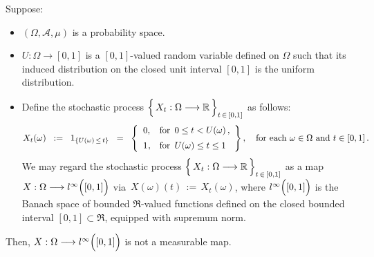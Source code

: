 \begin{example}
\mbox{}\vskip 0.1cm
\noindent
Suppose:
\begin{itemize}
\item
	$(\Omega,\mathcal{A},\mu)$ is a probability space.
\item
	$U : \Omega \longrightarrow [0,1]$ is a $[0,1]$-valued random variable
	defined on $\Omega$ such that its induced distribution on the closed
	unit interval $[0,1]$ is the uniform distribution.
\item
	Define the stochastic process
	$\left\{\, X_{t} : \Omega \overset{{\color{white}-}}{\longrightarrow} \Re \,\right\}_{t\,\in\,[0,1]}$
	as follows:
	\begin{equation*}
	X_{t}(\omega)
	\;\; := \;\;
		1_{\{U(\omega)\,\leq\,t\}}
	\;\; = \;\;
		\left\{\begin{array}{cl}
		0, & \textnormal{for \,$0 \leq t < U(\omega)$}\,,
		\\
		\overset{{\color{white}+}}{1}, & \textnormal{for \,$U(\omega) \leq t \leq 1$}
		\end{array}\right\},
	\quad
	\textnormal{for each $\omega \in \Omega$ and $t \in [0,1]$}\,.
	\end{equation*}
	We may regard the stochastic process
	$\left\{\, X_{t} : \Omega \overset{{\color{white}-}}{\longrightarrow} \Re \,\right\}_{t\,\in\,[0,1]}$
	as a map
	$X : \Omega \longrightarrow l^{\infty}\!\left([\overset{{\color{white}.}}{0},1]\right)$
	via \,$X(\omega)(t) \, := \, X_{t}(\omega)$,
	where  
	$l^{\infty}\!\left([\overset{{\color{white}.}}{0},1]\right)$
	is the Banach space of bounded $\Re$-valued functions defined on
	the closed bounded interval $[0,1] \subset \Re$, equipped with supremum norm.
\end{itemize}
Then,
$X : \Omega \longrightarrow l^{\infty}\!\left([\overset{{\color{white}.}}{0},1]\right)$
is not a measurable map.
\end{example}
